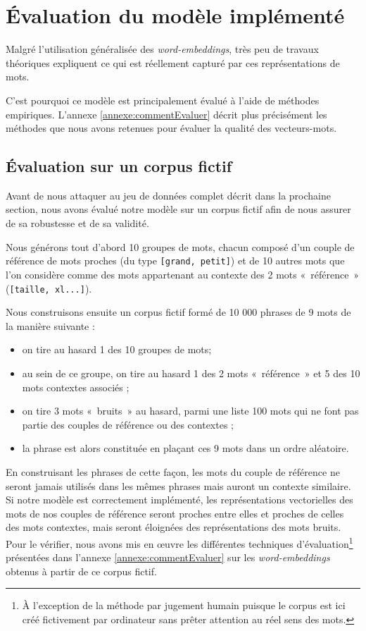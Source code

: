 \documentclass[11pt,french,french]{article}
\providecommand{\tightlist}{%
  \setlength{\parskip}{0pt}
  }
\let\rmarkdownfootnote\footnote%
\def\footnote{\protect\rmarkdownfootnote}
\begin{document}
\hypertarget{sec:evaluation}{%
\section{Évaluation du modèle implémenté}\label{sec:evaluation}}

Malgré l'utilisation généralisée des \emph{word-embeddings}, très peu de travaux théoriques expliquent ce qui est réellement capturé par ces représentations de mots.

C'est pourquoi ce modèle est principalement évalué à l'aide de méthodes empiriques.
L'annexe \ref{annexe:commentEvaluer} décrit plus précisément les méthodes que nous avons retenues pour évaluer la qualité des vecteurs-mots.

\hypertarget{sec:corpusFictif}{%
\subsection{Évaluation sur un corpus fictif}\label{sec:corpusFictif}}

Avant de nous attaquer au jeu de données complet décrit dans la prochaine section, nous avons évalué notre modèle sur un corpus fictif afin de nous assurer de sa robustesse et de sa validité.

Nous générons tout d'abord 10 groupes de mots, chacun composé d'un couple de référence de mots proches (du type \texttt{{[}grand,\ petit{]}}) et de 10 autres mots que l'on considère comme des mots appartenant au contexte des 2 mots «~référence~» (\texttt{{[}taille,\ xl...{]}}).

Nous construisons ensuite un corpus fictif formé de 10 000 phrases de 9 mots de la manière suivante :

\begin{itemize}
\tightlist
\item
  on tire au hasard 1 des 10 groupes de mots;
\item
  au sein de ce groupe, on tire au hasard 1 des 2 mots «~référence~» et 5 des 10 mots contextes associés ;
\item
  on tire 3 mots «~bruits~» au hasard, parmi une liste 100 mots qui ne font pas partie des couples de référence ou des contextes ;
\item
  la phrase est alors constituée en plaçant ces 9 mots dans un ordre aléatoire.
\end{itemize}

En construisant les phrases de cette façon, les mots du couple de référence ne seront jamais utilisés dans les mêmes phrases mais auront un contexte similaire.
Si notre modèle est correctement implémenté, les représentations vectorielles des mots de nos couples de référence seront proches entre elles et proches de celles des mots contextes, mais seront éloignées des représentations des mots bruits.
Pour le vérifier, nous avons mis en œuvre les différentes techniques d'évaluation\footnote{À l'exception de la méthode par \og jugement humain \fg{} puisque le corpus est ici créé fictivement par ordinateur sans prêter attention au réel sens des mots.}
présentées dans l'annexe \ref{annexe:commentEvaluer} sur les \emph{word-embeddings} obtenus à partir de ce corpus fictif.
\end{document}
